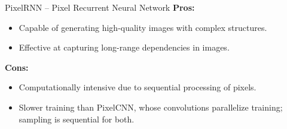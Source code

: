 \begin{frame}[allowframebreaks]{PixelRNN – Pixel Recurrent Neural Network}
    \framebreak
    \textbf{Pros:}
    \begin{itemize}
        \item Capable of generating high-quality images with complex structures.
        \item Effective at capturing long-range dependencies in images.
    \end{itemize}

    \textbf{Cons:}
    \begin{itemize}
        \item Computationally intensive due to sequential processing of pixels.
        \item Slower training than PixelCNN, whose convolutions parallelize training; sampling is sequential for both.
    \end{itemize}
\end{frame}